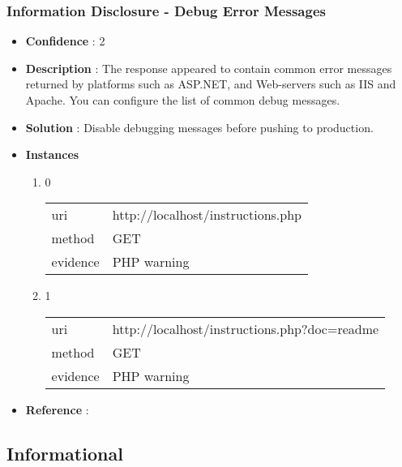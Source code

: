 \documentclass[10pt]{article}
\begin{document}
\subsubsection{Information Disclosure - Debug Error Messages}
\begin{itemize}
\item[] \textbf{Confidence} : 2
\item[] \textbf{Description} : The response appeared to contain common error messages returned by platforms such as ASP.NET, and Web-servers such as IIS and Apache. You can configure the list of common debug messages.
\item[] \textbf{Solution} :  Disable debugging messages before pushing to production.
\item[] \textbf{Instances}
\begin{enumerate}
\item[] 0
\begin{tabular}{| l | p{14cm}}
uri & http://localhost/instructions.php \\
method & GET \\
evidence & PHP warning \\
\end{tabular}
\item[] 1
\begin{tabular}{| l | p{14cm}}
uri & http://localhost/instructions.php?doc=readme \\
method & GET \\
evidence & PHP warning \\
\end{tabular}
\end{enumerate}
\item[] \textbf{Reference} : 
\end{itemize}
\subsection{Informational}
\end{document}
